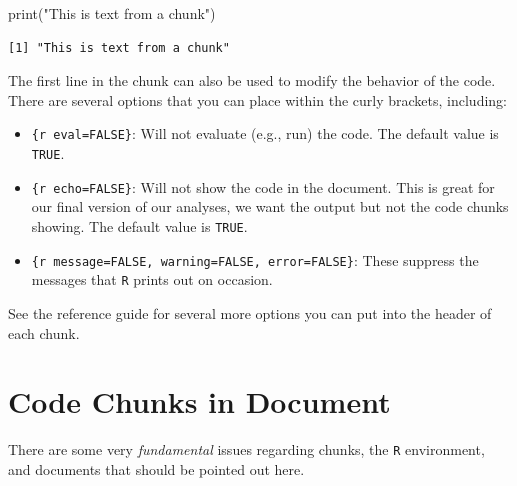 \documentclass[
  letterpaper,
]{book}
\newenvironment{Shaded}{\begin{snugshade}}{\end{snugshade}}
\newcommand{\FunctionTok}[1]{\textcolor[rgb]{0.28,0.35,0.67}{#1}}
\newcommand{\NormalTok}[1]{\textcolor[rgb]{0.00,0.23,0.31}{#1}}
\newcommand{\StringTok}[1]{\textcolor[rgb]{0.13,0.47,0.30}{#1}}
\providecommand{\tightlist}{%
  \setlength{\itemsep}{0pt}\setlength{\parskip}{0pt}}
\begin{document}
\begin{Shaded}
\begin{Highlighting}[]
\FunctionTok{print}\NormalTok{(}\StringTok{"This is text from a chunk"}\NormalTok{)}
\end{Highlighting}
\end{Shaded}

\begin{verbatim}
[1] "This is text from a chunk"
\end{verbatim}

The first line in the chunk can also be used to modify the behavior of
the code. There are several options that you can place within the curly
brackets, including:

\begin{itemize}
\tightlist
\item
  \texttt{\{r\ eval=FALSE\}}: Will not evaluate (e.g., run) the code.
  The default value is \texttt{TRUE}.\\
\item
  \texttt{\{r\ echo=FALSE\}}: Will not show the code in the document.
  This is great for our final version of our analyses, we want the
  output but not the code chunks showing. The default value is
  \texttt{TRUE}.\\
\item
  \texttt{\{r\ message=FALSE,\ warning=FALSE,\ error=FALSE\}}: These
  suppress the messages that \texttt{R} prints out on occasion.
\end{itemize}

See the reference guide for several more options you can put into the
header of each chunk.

\section{Code Chunks in Document}\label{code-chunks-in-document}

There are some very \emph{fundamental} issues regarding chunks, the
\texttt{R} environment, and documents that should be pointed out here.
\end{document}
